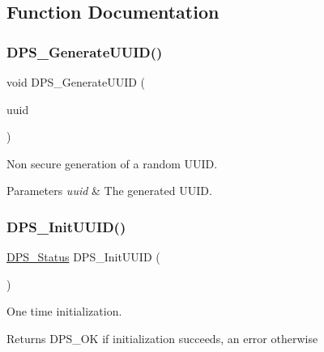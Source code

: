 \subsection{Function Documentation}
\mbox{\label{group__uuid_ga28a9b3d0518c4327afe94d087d1d2322}} 
\subsubsection{\texorpdfstring{D\+P\+S\+\_\+\+Generate\+U\+U\+I\+D()}{DPS\_GenerateUUID()}}
{\footnotesize\ttfamily void D\+P\+S\+\_\+\+Generate\+U\+U\+ID (\begin{DoxyParamCaption}\item[{\hyperlink{group__uuid_gaef1d03afcc6410602ade1d48f24c3997}{D\+P\+S\+\_\+\+U\+U\+ID} $\ast$}]{uuid }\end{DoxyParamCaption})}



Non secure generation of a random U\+U\+ID. 


\begin{DoxyParams}{Parameters}
{\em uuid} & The generated U\+U\+ID. \\
\hline
\end{DoxyParams}
\mbox{\label{group__uuid_ga725c154c5fccf2a2c9a6c32353a63228}} 
\subsubsection{\texorpdfstring{D\+P\+S\+\_\+\+Init\+U\+U\+I\+D()}{DPS\_InitUUID()}}
{\footnotesize\ttfamily \hyperlink{group__status_ga30395a84d3cad9d4ec29848106415038}{D\+P\+S\+\_\+\+Status} D\+P\+S\+\_\+\+Init\+U\+U\+ID (\begin{DoxyParamCaption}{ }\end{DoxyParamCaption})}



One time initialization. 

\begin{DoxyReturn}{Returns}
D\+P\+S\+\_\+\+OK if initialization succeeds, an error otherwise 
\end{DoxyReturn}
\mbox{\label{group__uuid_ga7819e63fac9457f892236b1b3f183713}} 
